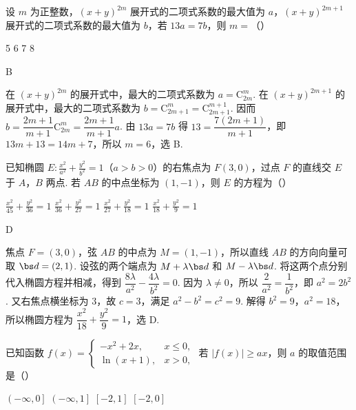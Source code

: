 \begin{problem}
设 \(m\) 为正整数，\(\left(x + y\right)^{2m}\) 展开式的二项式系数的最大值为 \(a\)，\(\left(x + y\right)^{2m + 1}\) 展开式的二项式系数的最大值为 \(b\)，若 \(13a = 7b\)，则 \(m =\)（\quad）

\choices
    {5}
    {6}
    {7}
    {8}
\end{problem}

\begin{answer}
B
\end{answer}

\begin{solution}
在 \((x+y)^{2m}\) 的展开式中，最大的二项式系数为 \(a=\mathrm C_{2m}^{m}\). 在 \((x+y)^{2m+1}\) 的展开式中，最大的二项式系数为 \(b=\mathrm C_{2m+1}^{m}=\mathrm C_{2m+1}^{m+1}\). 因而
\(b=\dfrac{2m+1}{m+1}\mathrm C_{2m}^{m}=\dfrac{2m+1}{m+1}a\). 由 \(13a=7b\) 得 \(13=\dfrac{7(2m+1)}{m+1}\)，即 \(13m+13=14m+7\)，所以 \(m=6\)，选 B.
\end{solution}

\begin{problem}
已知椭圆 \(E: \frac{x^2}{a^2} + \frac{y^2}{b^2} = 1\)（\(a > b > 0\)）的右焦点为 \(F\left(3,0\right)\)，过点 \(F\) 的直线交 \(E\) 于 \(A\)，\(B\) 两点. 若 \(AB\) 的中点坐标为 \(\left(1, -1\right)\)，则 \(E\) 的方程为（\quad）

\choices
    {\(\frac{x^2}{45} + \frac{y^2}{36} = 1\)}
    {\(\frac{x^2}{36} + \frac{y^2}{27} = 1\)}
    {\(\frac{x^2}{27} + \frac{y^2}{18} = 1\)}
    {\(\frac{x^2}{18} + \frac{y^2}{9} = 1\)}
\end{problem}

\begin{answer}
D
\end{answer}

\begin{solution}
焦点 \(F=(3,0)\)，弦 \(AB\) 的中点为 \(M=(1,-1)\)，所以直线 \(AB\) 的方向向量可取 \(\bs d=(2,1)\). 设弦的两个端点为 \(M+\lambda\bs d\) 和 \(M-\lambda\bs d\). 将这两个点分别代入椭圆方程并相减，得到
\(\dfrac{8\lambda}{a^2}-\dfrac{4\lambda}{b^2}=0\). 因为 \(\lambda\neq0\)，所以 \(\dfrac{2}{a^2}=\dfrac{1}{b^2}\)，即 \(a^2=2b^2\). 又右焦点横坐标为 \(3\)，故 \(c=3\)，满足 \(a^2-b^2=c^2=9\). 解得 \(b^2=9\)，\(a^2=18\)，所以椭圆方程为 \(\dfrac{x^2}{18}+\dfrac{y^2}{9}=1\)，选 D.
\end{solution}

\begin{problem}
已知函数 \( f(x) = \begin{cases}
-x^2 + 2x, & x \leqslant 0,\\
\ln\left(x + 1\right), & x > 0,
\end{cases} \) 若 \( |f(x)| \geqslant ax \)，则 \( a \) 的取值范围是（\quad）

\choices
    {\(\left(-\infty, 0\right]\)}
    {\(\left(-\infty, 1\right]\)}
    {\(\left[-2, 1\right]\)}
    {\(\left[-2, 0\right]\)}
\end{problem}

